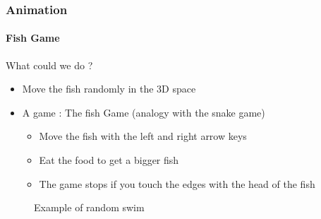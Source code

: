 \documentclass[9pt]{beamer}
\begin{document}
\begin{frame}
\frametitle{Animation}
\framesubtitle{Fish Game}
\begin{block}{What could we do ?}
\begin{itemize}
\item Move the fish randomly in the 3D space
\item A game : The fish Game (analogy with the snake game)
\begin{itemize}
\item Move the fish with the left and right arrow keys
\item Eat the food to get a bigger fish
\item The game stops if you touch the edges with the head of the fish
\end{itemize}
\end{itemize}
\end{block}
\begin{figure}[h!]
\centering 
{}
  \caption{Example of random swim}
 \end{figure} 

\end{frame}
\end{document}
